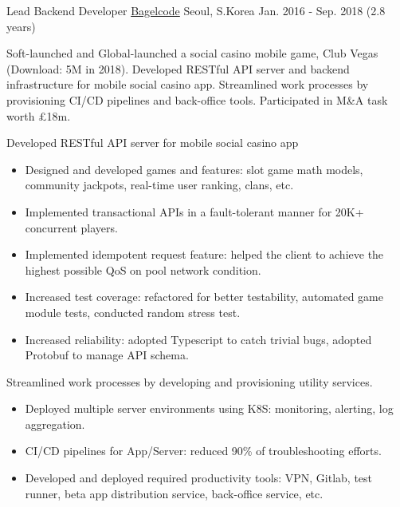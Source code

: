 \begin{cventries}
  \cventry
    {Lead Backend Developer} %
    {\href{https://bagelcode.com}{Bagelcode}} %
    {Seoul, S.Korea} %
    {Jan. 2016 - Sep. 2018 (2.8 years)} %
    {
      Soft-launched and Global-launched a social casino mobile game, Club Vegas (Download: 5M in 2018). Developed RESTful API server and backend infrastructure for mobile social casino app. Streamlined work processes by provisioning CI/CD pipelines and back-office tools. Participated in M\&A task worth £18m.\newline
      \vspace{6mm}
      \begin{cvitems} %
        \item Developed RESTful API server for mobile social casino app
        \begin{itemize}[leftmargin=2ex]
          \item Designed and developed games and features: slot game math models, community jackpots, real-time user ranking, clans, etc.
          \item Implemented transactional APIs in a fault-tolerant manner for 20K+ concurrent players.
          \item Implemented idempotent request feature: helped the client to achieve the highest possible QoS on pool network condition.
          \item Increased test coverage: refactored for better testability, automated game module tests, conducted random stress test.
          \item Increased reliability: adopted Typescript to catch trivial bugs, adopted Protobuf to manage API schema.
        \end{itemize}
        \item Streamlined work processes by developing and provisioning utility services.
        \begin{itemize}[leftmargin=2ex]
          \item Deployed multiple server environments using K8S: monitoring, alerting, log aggregation.
          \item CI/CD pipelines for App/Server: reduced 90\% of troubleshooting efforts.
          \item Developed and deployed required productivity tools: VPN, Gitlab, test runner, beta app distribution service, back-office service, etc.
        \end{itemize}

\end{cvitems}}
\end{cventries}

